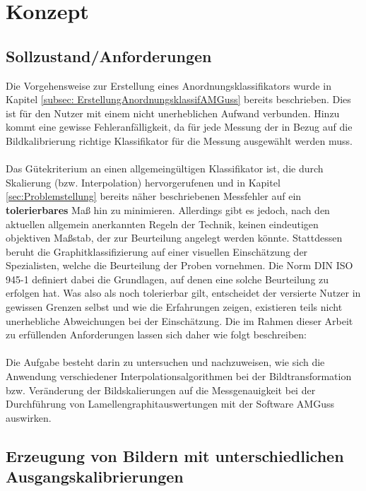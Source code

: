 \documentclass[
fontsize=10pt, 
listof = totoc,
parskip = half	
]{report}
\begin{document}
\chapter{Konzept}
\label{ch:Konzept}

\section{Sollzustand/Anforderungen}
\label{sec:DefAnforderungenAnordnKlas}
Die Vorgehensweise zur Erstellung eines Anordnungsklassifikators wurde in Kapitel \ref{subsec: ErstellungAnordnungsklassifAMGuss} bereits beschrieben. Dies ist für den Nutzer mit einem nicht unerheblichen Aufwand verbunden. Hinzu kommt eine gewisse Fehleranfälligkeit, da für jede Messung der in Bezug auf die Bildkalibrierung richtige Klassifikator für die Messung ausgewählt werden muss.
\\\\
\noindent Das Gütekriterium an einen allgemeingültigen Klassifikator ist, die durch Skalierung (bzw. Interpolation) hervorgerufenen und in Kapitel \ref{sec:Problemstellung} bereits näher beschriebenen Messfehler auf ein \textbf{tolerierbares} Maß hin zu minimieren. Allerdings gibt es jedoch, nach den aktuellen allgemein anerkannten Regeln der Technik, keinen eindeutigen objektiven Maßstab, der zur Beurteilung angelegt werden könnte. Stattdessen beruht die Graphitklassifizierung auf einer visuellen Einschätzung der Spezialisten, welche die Beurteilung der Proben vornehmen. Die Norm DIN ISO 945-1 definiert dabei die Grundlagen, auf denen eine solche Beurteilung zu erfolgen hat. Was also als noch tolerierbar gilt, entscheidet der versierte Nutzer in gewissen Grenzen selbst und wie die Erfahrungen zeigen, existieren teils nicht unerhebliche Abweichungen bei der Einschätzung. Die im Rahmen dieser Arbeit zu erfüllenden Anforderungen lassen sich daher wie folgt beschreiben:
\\\\
\noindent Die Aufgabe besteht darin zu untersuchen und nachzuweisen, wie sich die Anwendung verschiedener Interpolationsalgorithmen bei der Bildtransformation bzw. Veränderung der Bildskalierungen auf die Messgenauigkeit bei der Durchführung von Lamellengraphitauswertungen mit der Software AMGuss auswirken. 

\section{Erzeugung von Bildern mit unterschiedlichen Ausgangskalibrierungen}
\end{document}
